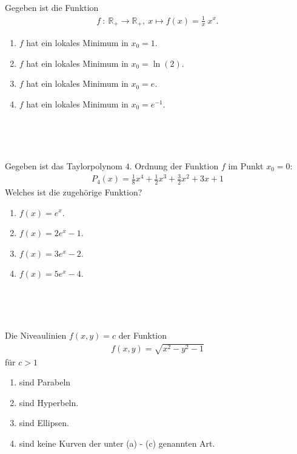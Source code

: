 \subsection*{}
Gegeben ist die Funktion 
\begin{align*}
f \ : \ \mathbb{R}_+ \to \mathbb{R}_+, \
x \mapsto f(x) = \frac{1}{x} \ x^x.
\end{align*}
\renewcommand{\labelenumi}{(\alph{enumi})}
\begin{enumerate}
\item $f$ hat ein lokales Minimum in $x_0 = 1$.
\item $f$ hat ein lokales Minimum in $x_0 = \ln(2)$.
\item $f$ hat ein lokales Minimum in $x_0 = e$.
\item $f$ hat ein lokales Minimum in $x_0 = e^{-1}$.


\end{enumerate}
\ \\
\\
\subsection*{}
Gegeben ist das Taylorpolynom $4.$ Ordnung der Funktion $f$ im Punkt $x_0 = 0$:
\begin{align*}
P_4(x) = \frac{1}{8}x^4 + \frac{1}{2} x^3 + \frac{3}{2} x^2 + 3x +1
\end{align*}
Welches ist die zugehörige Funktion?
\renewcommand{\labelenumi}{(\alph{enumi})}
\begin{enumerate}
\item $f(x) = e^x$.
\item $f(x) = 2  e^x - 1$.
\item $f(x) = 3  e^x - 2$.
\item $f(x) = 5  e^x - 4$.
\end{enumerate}
\ \\
\\
\subsection*{}
Die Niveaulinien $f(x,y) = c$ der Funktion
\begin{align*}
f(x,y) = \sqrt{x^2 - y^2 -1}
\end{align*}
für $c > 1$
\renewcommand{\labelenumi}{(\alph{enumi})}
\begin{enumerate}
\item sind Parabeln
\item sind Hyperbeln.
\item sind Ellipsen.
\item sind keine Kurven der unter (a) - (c) genannten Art.
\end{enumerate}
\ \\
\\
